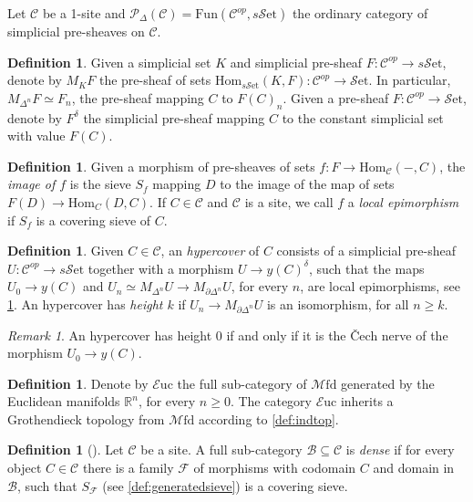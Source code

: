 \documentclass[10pt]{amsart}
\newcommand{\B}{\mathscr{B}}
\newcommand{\C}{\mathscr{C}}
\newcommand{\F}{\mathscr{F}}
\newcommand{\bR}{\mathbb{R}}
\newcommand{\rP}{\mathscr{P}}
\newcommand{\Hom}{\mathrm{Hom}}
\newcommand{\set}{\mathscr{S}\mathrm{et}}
\newcommand{\sset}{s\mathscr{S}\mathrm{et}}
\newcommand{\Fun}{\mathrm{Fun}}
\newcommand{\Euc}{\mathscr{E}\mathrm{uc}}
\newcommand{\Mfd}{\mathscr{M}\mathrm{fd}}
\theoremstyle{definition}
\newtheorem{definition}[equation]{Definition}
\theoremstyle{remark}
\newtheorem{remark}[equation]{Remark}
\numberwithin{equation}{section}
\begin{document}
Let $\C$ be a 1-site and $\rP_\Delta(\C)=\Fun(\C^{op},\sset)$ the ordinary category of simplicial pre-sheaves on $\C$. 
\begin{definition}
	Given a simplicial set $K$ and simplicial pre-sheaf $F:\C^{op}\to\sset$, denote by $M_KF$ the pre-sheaf of sets $\Hom_{\sset}(K,F):\C^{op}\to\set$. In particular, $M_{\Delta^n}F\simeq F_n$, the pre-sheaf mapping $C$ to $F(C)_n$. Given a pre-sheaf $F:\C^{op}\to\set$, denote by $F^\delta$ the simplicial pre-sheaf mapping $C$ to the constant simplicial set with value $F(C)$. 
\end{definition}
\begin{definition}\label{def:locepi}
	Given a morphism of pre-sheaves of sets $f:F\to\Hom_\C(-,C)$, the \emph{image of $f$} is the sieve $S_f$  mapping $D$ to the image of the map of sets $F(D)\to\Hom_C(D,C)$. If $C\in\C$ and $\C$ is a site, we call $f$ a \emph{local epimorphism} if $S_f$ is a covering sieve of $C$. 
\end{definition}
\begin{definition}
	Given $C\in\C$, an \emph{hypercover} of $C$ consists of a simplicial pre-sheaf $U:\C^{op}\to\sset$ together with a morphism $U\to y(C)^\delta$, such that the maps $U_0\to y(C)$ and $U_n\simeq M_{\Delta^n}U\to M_{\partial\Delta^n}U$, for every $n$, are local epimorphisms, see \cref{def:locepi}. An hypercover has \emph{height $k$} if $U_n\to M_{\partial\Delta^n}U$ is an isomorphism, for all $n\geq k$. 
\end{definition}
\begin{remark}
	An hypercover has height 0 if and only if it is the \v Cech nerve of the morphism $U_0\to y(C)$. 
\end{remark}

\begin{definition}
	Denote by $\Euc$ the full sub-category of $\Mfd$ generated by the Euclidean manifolds $\bR^n$, for every $n\geq0$. The category $\Euc$ inherits a Grothendieck topology from $\Mfd$ according to \cref{def:indtop}.
\end{definition}

\begin{definition}[{\cite[Definition 3.12.2]{barwick2020exodromy}}]\label{def:dense}
	Let $\C$ be a site. A full sub-category $\B\subseteq\C$ is \emph{dense} if for every object $C\in\C$ there is a family $\F$ of morphisms with codomain $C$ and domain in $\B$, such that $S_\F$ (see \cref{def:generatedsieve}) is a covering sieve. 
\end{definition}
\end{document}
